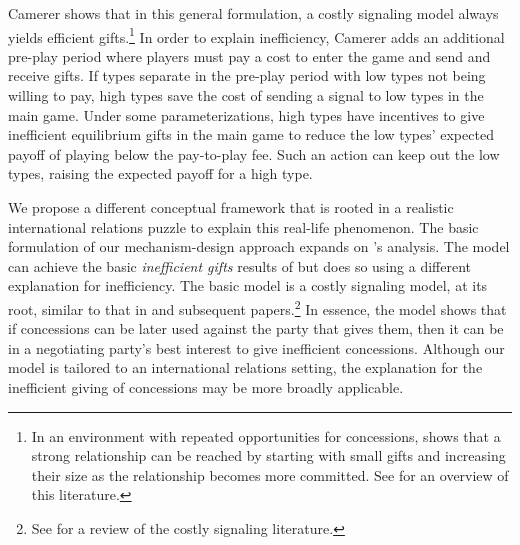 \documentclass[bibtex,autowc]{apsr_submission}
\begin{document}
Camerer shows that in this general formulation, a costly signaling model always yields efficient gifts.\footnote{In an environment with repeated opportunities for concessions, \cite{watson1999starting}  shows that a strong relationship can be reached by starting with small gifts and increasing their size as the relationship becomes more committed. See \cite{van2000economics} for an overview of this literature.} In order to explain inefficiency, Camerer adds an additional pre-play period where players must pay a cost to enter the game and send and receive gifts. If types separate in the pre-play period with low types not being willing to pay, high types save the cost of sending a signal to low types in the main game. Under some parameterizations, high types have incentives to give inefficient equilibrium gifts in the main game to reduce the low types' expected payoff of playing below the pay-to-play fee. Such an action can keep out the low types, raising the expected payoff for a high type. 



We propose a different conceptual framework that is rooted in a realistic international relations puzzle to explain this real-life phenomenon. The basic formulation of our mechanism-design approach expands on \cite{camerer1988}'s analysis. The model can achieve the basic \emph{inefficient gifts} results of \cite{camerer1988} %
but does so using a different explanation for inefficiency. The basic model is a costly signaling model, at its root, similar to that in \cite{spence1973} and subsequent papers.\footnote{See \cite{connelly2011} for a review of the costly signaling literature.} In essence, the model shows that if concessions can be later used against the party that gives them, then it can be in a negotiating party's best interest to give inefficient concessions. Although our model is tailored to an international relations setting, the explanation for the inefficient giving of concessions may be more broadly applicable. 
\end{document}
